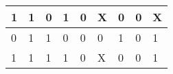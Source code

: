 \documentclass{article}
\begin{document}
\begin{table}[H]
\begin{center}
\begin{tabular}{|l|ll|ll|l|l|l|l|}
    			1                          & \multicolumn{1}{l|}{1}                           & 0                                               & \multicolumn{1}{l|}{1}           & 0                        & X                               & 0                               & 0                               & X                                                      \\ \hline
    			0                          & \multicolumn{1}{l|}{1}                           & 1                                               & \multicolumn{1}{l|}{0}           & 0                        & 0                               & 1                               & 0                               & 1                                                      \\ \hline
    			1                          & \multicolumn{1}{l|}{1}                           & 1                                               & \multicolumn{1}{l|}{1}           & 0                        & X                               & 0                               & 0                               & 1                                                      \\ \hline
    		\end{tabular}
    	\end{center}
    	\end{table}

    
    
\end{document}
